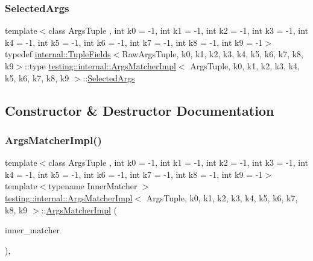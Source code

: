 \mbox{\label{classtesting_1_1internal_1_1_args_matcher_impl_ab061679f6251e56ccbedaf0c316d00ff}} 
\subsubsection{\texorpdfstring{Selected\+Args}{SelectedArgs}}
{\footnotesize\ttfamily template$<$class Args\+Tuple , int k0 = -\/1, int k1 = -\/1, int k2 = -\/1, int k3 = -\/1, int k4 = -\/1, int k5 = -\/1, int k6 = -\/1, int k7 = -\/1, int k8 = -\/1, int k9 = -\/1$>$ \\
typedef \hyperlink{classtesting_1_1internal_1_1_tuple_fields}{internal\+::\+Tuple\+Fields}$<$Raw\+Args\+Tuple, k0, k1, k2, k3, k4, k5, k6, k7, k8, k9$>$\+::type \hyperlink{classtesting_1_1internal_1_1_args_matcher_impl}{testing\+::internal\+::\+Args\+Matcher\+Impl}$<$ Args\+Tuple, k0, k1, k2, k3, k4, k5, k6, k7, k8, k9 $>$\+::\hyperlink{classtesting_1_1internal_1_1_args_matcher_impl_ab061679f6251e56ccbedaf0c316d00ff}{Selected\+Args}}



\subsection{Constructor \& Destructor Documentation}
\mbox{\label{classtesting_1_1internal_1_1_args_matcher_impl_a7f7a9a826d130d11fe30633d79f59a06}} 
\subsubsection{\texorpdfstring{Args\+Matcher\+Impl()}{ArgsMatcherImpl()}}
{\footnotesize\ttfamily template$<$class Args\+Tuple , int k0 = -\/1, int k1 = -\/1, int k2 = -\/1, int k3 = -\/1, int k4 = -\/1, int k5 = -\/1, int k6 = -\/1, int k7 = -\/1, int k8 = -\/1, int k9 = -\/1$>$ \\
template$<$typename Inner\+Matcher $>$ \\
\hyperlink{classtesting_1_1internal_1_1_args_matcher_impl}{testing\+::internal\+::\+Args\+Matcher\+Impl}$<$ Args\+Tuple, k0, k1, k2, k3, k4, k5, k6, k7, k8, k9 $>$\+::\hyperlink{classtesting_1_1internal_1_1_args_matcher_impl}{Args\+Matcher\+Impl} (\begin{DoxyParamCaption}\item[{const Inner\+Matcher \&}]{inner\+\_\+matcher }\end{DoxyParamCaption})\hspace{0.3cm}{\ttfamily [inline]}, {\ttfamily [explicit]}}



